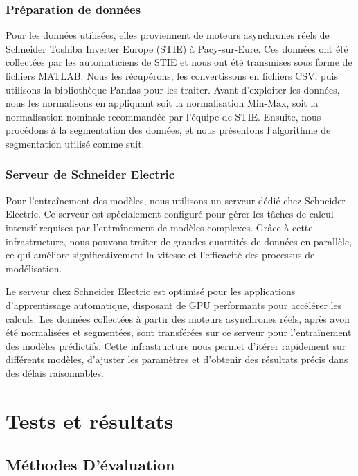 \subsubsection{Préparation de données}

Pour les données utilisées, elles proviennent de moteurs asynchrones réels de
Schneider Toshiba Inverter Europe (STIE) à Pacy-sur-Eure. Ces données ont été
collectées par les automaticiens de STIE et nous ont été transmises sous forme
de fichiers MATLAB. Nous les récupérons, les convertissons en fichiers CSV,
puis utilisons la bibliothèque Pandas pour les traiter. Avant d'exploiter les
données, nous les normalisons en appliquant soit la normalisation Min-Max, soit
la normalisation nominale recommandée par l'équipe de STIE. Ensuite, nous
procédons à la segmentation des données, et nous présentons l'algorithme de
segmentation utilisé comme suit.

\subsubsection{Serveur de Schneider Electric}

Pour l'entraînement des modèles, nous utilisons un serveur dédié chez Schneider
Electric. Ce serveur est spécialement configuré pour gérer les tâches de calcul
intensif requises par l'entraînement de modèles complexes. Grâce à cette
infrastructure, nous pouvons traiter de grandes quantités de données en
parallèle, ce qui améliore significativement la vitesse et l'efficacité des
processus de modélisation.

Le serveur chez Schneider Electric est optimisé pour les applications
d'apprentissage automatique, disposant de GPU performants pour accélérer les
calculs. Les données collectées à partir des moteurs asynchrones réels, après
avoir été normalisées et segmentées, sont transférées sur ce serveur pour
l'entraînement des modèles prédictifs. Cette infrastructure nous permet
d'itérer rapidement sur différents modèles, d'ajuster les paramètres et
d'obtenir des résultats précis dans des délais raisonnables.

\section{Tests et résultats}

\subsection{Méthodes D'évaluation}


